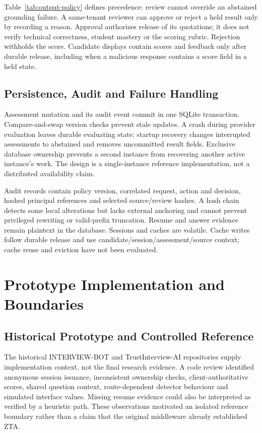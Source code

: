 \documentclass[conference]{IEEEtran}
\begin{document}
Table~\ref{tab:output-policy} defines precedence: review cannot override an abstained grounding failure. A same-tenant reviewer can approve or reject a held result only by recording a reason. Approval authorizes release of its quotations; it does not verify technical correctness, student mastery or the scoring rubric. Rejection withholds the score. Candidate displays contain scores and feedback only after durable release, including when a malicious response contains a score field in a held state.

\subsection{Persistence, Audit and Failure Handling}
Assessment mutation and its audit event commit in one SQLite transaction. Compare-and-swap version checks prevent stale updates. A crash during provider evaluation leaves durable evaluating state; startup recovery changes interrupted assessments to abstained and removes uncommitted result fields. Exclusive database ownership prevents a second instance from recovering another active instance's work. The design is a single-instance reference implementation, not a distributed availability claim.

Audit records contain policy version, correlated request, action and decision, hashed principal references and selected source/review hashes. A hash chain detects some local alterations but lacks external anchoring and cannot prevent privileged rewriting or valid-prefix truncation. Resume and answer evidence remain plaintext in the database. Sessions and caches are volatile. Cache writes follow durable release and use candidate/session/assessment/source context; cache reuse and eviction have not been evaluated.

\section{Prototype Implementation and Boundaries}
\subsection{Historical Prototype and Controlled Reference}
The historical INTERVIEW-BOT and TrustInterview-AI repositories supply implementation context, not the final research evidence. A code review identified anonymous session issuance, inconsistent ownership checks, client-authoritative scores, shared question context, route-dependent detector behaviour and simulated interface values. Missing resume evidence could also be interpreted as verified by a heuristic path. These observations motivated an isolated reference boundary rather than a claim that the original middleware already established ZTA.
\end{document}
